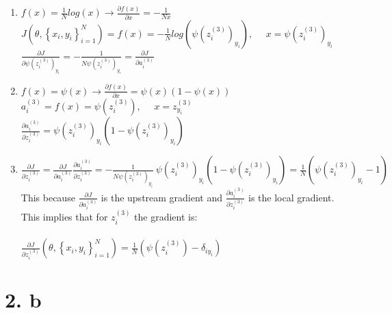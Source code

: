 \documentclass[
	12pt, %
]{fphw}
\begin{document}
\begin{enumerate}
\item $f(x) = \frac{1}{N} log(x) \rightarrow \frac{\partial f(x)}{\partial x} = -\frac{1}{Nx}$  \\ 

$J\left(\theta,\left\{x_{i}, y_{i}\right\}_{i=1}^{N}\right) = f(x) = - \frac {1}{N} log(\psi (z_{i}^{(3)})_{y_{i}}),\ \ \ \ \ \  x = \psi(z_{i}^{(3)})_{y_{i}} $ \\ 

$\frac{\partial J}{\partial \psi(z_{i}^{(3)})_{y_{i}}} = - \frac{1}{N \psi(z_{i}^{(3)})_{y_{i}}} = \frac{\partial J}{\partial a_{i}^{(3)}}$ \\


\item $f(x) = \psi(x) \rightarrow \frac{\partial f(x)}{\partial x} = \psi (x) (1 - \psi(x))$ \\

$ a_{i}^{(3)} = f(x) = \psi(z_{i}^{(3)}),\ \ \ \ \ \ x = z_{y_{i}}^{(3)}$ \\

$ \frac{\partial a_{i}^{(3)}}{\partial z_{i}^{(3)}} = \psi(z_{i}^{(3)})_{y_{i}} (1 - \psi(z_{i}^{(3)})_{y_{i}}) $ \\

\item $\frac{\partial J}{\partial z_{i}^{(3)}} = \frac{\partial J}{\partial a_{i}^{(3)}} \frac{\partial a_{i}^{(3)}}{\partial z_{i}^{(3)}} = - \frac{1}{N \psi(z_{i}^{(3)})_{y_{i}}} \ \psi(z_{i}^{(3)})_{y_{i}} (1 - \psi(z_{i}^{(3)})_{y_{i}}) = \frac{1}{N} (\psi(z_{i}^{(3)})_{y_{i}} - 1)$ \\

This because $\frac{\partial J}{\partial a_{i}^{(3)}}$ is the upstream gradient and $\frac{\partial a_{i}^{(3)}}{\partial z_{i}^{(3)}}$ is the local gradient. This implies that for $z_{i}^{(3)}$ the gradient is: \\ \\ $\frac{\partial J}{\partial z_{i}^{(3)}}\left(\theta,\left\{x_{i}, y_{i}\right\}_{i=1}^{N}\right)=\frac{1}{N}\left(\psi\left(z_{i}^{(3)}\right)-\delta_{i y_{i}}\right)$

\end{enumerate}

\newpage
\section* {2. b}
\end{document}
